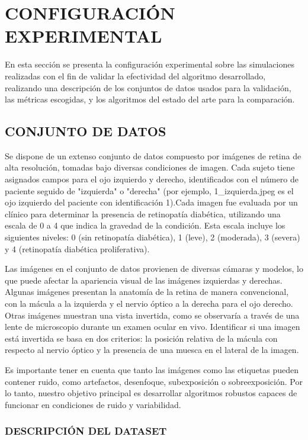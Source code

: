 
\chapter{CONFIGURACIÓN EXPERIMENTAL}

En esta sección se presenta la configuración experimental sobre las simulaciones
realizadas con el fin de validar la efectividad del algoritmo desarrollado, realizando una
descripción de los conjuntos de datos usados para la validación, las métricas escogidas, y
los algoritmos del estado del arte para la comparación.

\section{CONJUNTO DE DATOS}

Se dispone de un extenso conjunto de datos compuesto por imágenes de retina de alta
resolución, tomadas bajo diversas condiciones de imagen. Cada sujeto tiene asignados
campos para el ojo izquierdo y derecho, identificados con el número de paciente seguido de
"izquierda" o "derecha" (por ejemplo, 1\_izquierda.jpeg es el ojo izquierdo del paciente
con identificación 1).Cada imagen fue evaluada por un clínico para determinar la presencia
de retinopatía diabética, utilizando una escala de 0 a 4 que indica la gravedad de la
condición. Esta escala incluye los siguientes niveles: 0 (sin retinopatía diabética), 1
(leve), 2 (moderada), 3 (severa) y 4 (retinopatía diabética proliferativa).

Las imágenes en el conjunto de datos provienen de diversas cámaras y modelos, lo que puede
afectar la apariencia visual de las imágenes izquierdas y derechas. Algunas imágenes
presentan la anatomía de la retina de manera convencional, con la mácula a la izquierda y
el nervio óptico a la derecha para el ojo derecho. Otras imágenes muestran una vista
invertida, como se observaría a través de una lente de microscopio durante un examen
ocular en vivo. Identificar si una imagen está invertida se basa en dos criterios: la
posición relativa de la mácula con respecto al nervio óptico y la presencia de una muesca
en el lateral de la imagen.

Es importante tener en cuenta que tanto las imágenes como las etiquetas pueden contener
ruido, como artefactos, desenfoque, subexposición o sobreexposición. Por lo tanto, nuestro
objetivo principal es desarrollar algoritmos robustos capaces de funcionar en condiciones
de ruido y variabilidad.

\subsection{DESCRIPCIÓN DEL DATASET}

